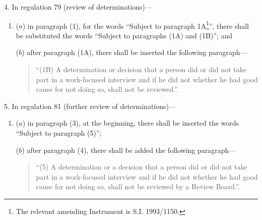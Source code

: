 \documentclass[12pt,a4paper]{article}
\begin{document}
\medskip

4.  In regulation 79 (review of determinations)—
\begin{enumerate}\item[]
($a$) in paragraph (1), for the words “Subject to paragraph 1A\footnote{\frenchspacing The relevant amending Instrument is S.I. 1993/1150.}”, there shall be substituted the words “Subject to paragraphs (1A) and (1B)”; and

($b$) after paragraph (1A), there shall be inserted the following paragraph—
\begin{quotation}
“(1B) A determination or decision that a person did or did not take part in a work-focused interview and if he did not whether he had good cause for not doing so, shall not be reviewed.”.
\end{quotation}
\end{enumerate}

\medskip

5.  In regulation 81 (further review of determinations)—
\begin{enumerate}\item[]
($a$) in paragraph (3), at the beginning, there shall be inserted the words “Subject to paragraph (5)”;

($b$) after paragraph (4), there shall be added the following paragraph—
\begin{quotation}
“(5) A determination or a decision that a person did or did not take part in a work-focused interview and if he did not whether he had good cause for not doing so, shall not be reviewed by a Review Board.”.
\end{quotation}
\end{enumerate}

\medskip
\end{document}
